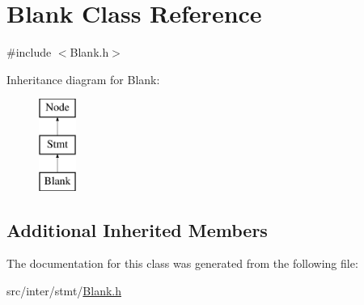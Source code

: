\hypertarget{class_blank}{}\section{Blank Class Reference}
\label{class_blank}


{\ttfamily \#include $<$Blank.\+h$>$}

Inheritance diagram for Blank\+:\begin{figure}[H]
\begin{center}
\leavevmode
\includegraphics[height=3.000000cm]{class_blank}
\end{center}
\end{figure}
\subsection*{Additional Inherited Members}


The documentation for this class was generated from the following file\+:\begin{DoxyCompactItemize}
\item 
src/inter/stmt/\hyperlink{_blank_8h}{Blank.\+h}\end{DoxyCompactItemize}
